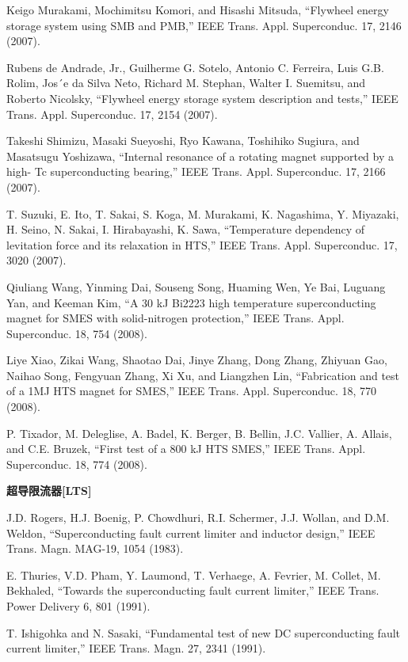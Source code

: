 \noindent [9.105] Keigo Murakami, Mochimitsu Komori, and Hisashi Mitsuda, ``Flywheel energy
storage system using SMB and PMB,” IEEE Trans. Appl. Superconduc. 17, 2146
(2007).

\noindent [9.106] Rubens de Andrade, Jr., Guilherme G. Sotelo, Antonio C. Ferreira, Luis G.B.
Rolim, Jos´e da Silva Neto, Richard M. Stephan, Walter I. Suemitsu, and Roberto
Nicolsky, ``Flywheel energy storage system description and tests,” IEEE Trans.
Appl. Superconduc. 17, 2154 (2007).

\noindent [9.107] Takeshi Shimizu, Masaki Sueyoshi, Ryo Kawana, Toshihiko Sugiura, and Masatsugu
Yoshizawa, ``Internal resonance of a rotating magnet supported by a high-
Tc superconducting bearing,” IEEE Trans. Appl. Superconduc. 17, 2166 (2007).

\noindent [9.108] T. Suzuki, E. Ito, T. Sakai, S. Koga, M. Murakami, K. Nagashima, Y. Miyazaki,
H. Seino, N. Sakai, I. Hirabayashi, K. Sawa, ``Temperature dependency of levitation
force and its relaxation in HTS,” IEEE Trans. Appl. Superconduc. 17, 3020
(2007).

\noindent [9.109] Qiuliang Wang, Yinming Dai, Souseng Song, Huaming Wen, Ye Bai, Luguang
Yan, and Keeman Kim, ``A 30 kJ Bi2223 high temperature superconducting magnet
for SMES with solid-nitrogen protection,” IEEE Trans. Appl. Superconduc.
18, 754 (2008).

\noindent [9.110] Liye Xiao, Zikai Wang, Shaotao Dai, Jinye Zhang, Dong Zhang, Zhiyuan Gao,
Naihao Song, Fengyuan Zhang, Xi Xu, and Liangzhen Lin, ``Fabrication and test
of a 1MJ HTS magnet for SMES,” IEEE Trans. Appl. Superconduc. 18, 770
(2008).

\noindent [9.111] P. Tixador, M. Deleglise, A. Badel, K. Berger, B. Bellin, J.C. Vallier, A. Allais, and
C.E. Bruzek, ``First test of a 800 kJ HTS SMES,” IEEE Trans. Appl. Superconduc.
18, 774 (2008).

\noindent \textbf{超导限流器[LTS] }

\noindent [9.112] J.D. Rogers, H.J. Boenig, P. Chowdhuri, R.I. Schermer, J.J. Wollan, and D.M.
Weldon, ``Superconducting fault current limiter and inductor design,” IEEE
Trans. Magn. MAG-19, 1054 (1983).

\noindent [9.113] E. Thuries, V.D. Pham, Y. Laumond, T. Verhaege, A. Fevrier, M. Collet, M.
Bekhaled, ``Towards the superconducting fault current limiter,” IEEE Trans.
Power Delivery 6, 801 (1991).

\noindent [9.114] T. Ishigohka and N. Sasaki, ``Fundamental test of new DC superconducting fault
current limiter,” IEEE Trans. Magn. 27, 2341 (1991).

